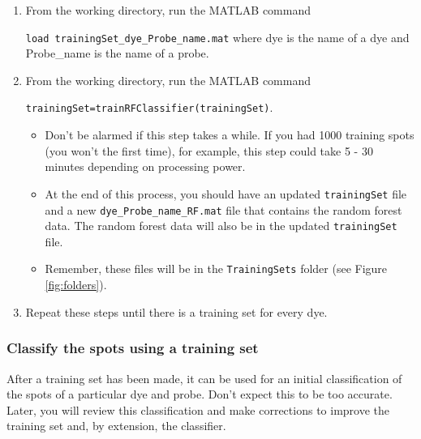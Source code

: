 \documentclass[titlepage,11pt]{article}
\begin{document}
\begin{enumerate}
\item From the working directory, run the MATLAB command 

\texttt{load trainingSet\_dye\_Probe\_name.mat} where dye is the name of a dye and Probe\_name is the name of a probe.
\item From the working directory, run the MATLAB command 

\texttt{trainingSet=trainRFClassifier(trainingSet)}.
\begin{itemize}
\item Don't be alarmed if this step takes a while. If you had 1000 training spots (you won't the first time), for example, this step could take 5 - 30 minutes depending on processing power.
\item At the end of this process, you should have an updated \texttt{trainingSet} file and a new \texttt{dye\_Probe\_name\_RF.mat} file that contains the random forest data. The random forest data will also be in the updated \texttt{trainingSet} file.
\item Remember, these files will be in the \texttt{TrainingSets} folder (see Figure \ref{fig:folders}).
\end{itemize}
\item Repeat these steps until there is a training set for every dye.
\end{enumerate}

\subsubsection{Classify the spots using a training set}
After a training set has been made, it can be used for an initial classification of the spots of a particular dye and probe. Don't expect this to be too accurate. Later, you will review this classification and make corrections to improve the training set and, by extension, the classifier.
\end{document}
